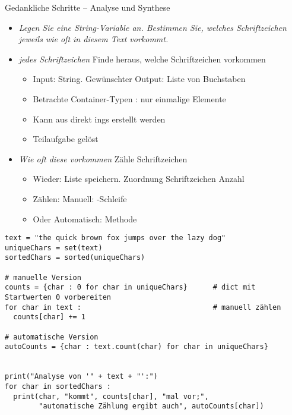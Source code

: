 \begin{frame}[fragile]{Gedankliche Schritte -- Analyse und Synthese}
%
\begin{itemize}
\item \emph{Legen Sie eine String-Variable an. Bestimmen Sie, welches Schriftzeichen jeweils wie oft in diesem Text vorkommt.}
\item \emph{jedes Schriftzeichen} \Thus Finde heraus, welche Schriftzeichen vorkommen
	\begin{itemize}
	\item Input: String. Gewünschter Output: Liste von Buchstaben
	\item Betrachte Container-Typen \Thus {}: nur einmalige Elemente
	\item Kann aus direkt ings erstellt werden
	\item[\Thus] Teilaufgabe gelöst
	\end{itemize}
\item \emph{Wie oft diese vorkommen} \Thus Zähle Schriftzeichen
	\begin{itemize}
	\item Wieder: Liste speichern. Zuordnung Schriftzeichen \thus Anzahl \Thus {}
	\item Zählen: Manuell: -Schleife
	\item Oder Automatisch: Methode 
	\end{itemize}
\end{itemize}
%
\end{frame}


\begin{frame}[fragile]
%
%
\begin{codebox}
\begin{verbatim}
text = "the quick brown fox jumps over the lazy dog"
uniqueChars = set(text)
sortedChars = sorted(uniqueChars)

# manuelle Version
counts = {char : 0 for char in uniqueChars}      # dict mit Startwerten 0 vorbereiten
for char in text :                               # manuell zählen
  counts[char] += 1

# automatische Version
autoCounts = {char : text.count(char) for char in uniqueChars}


print("Analyse von '" + text + "':")
for char in sortedChars :
  print(char, "kommt", counts[char], "mal vor;",
        "automatische Zählung ergibt auch", autoCounts[char])
\end{verbatim}
\end{codebox}
%
\end{frame}

